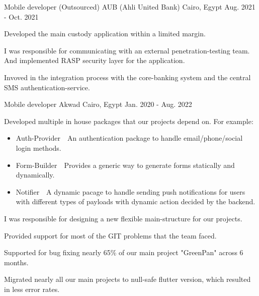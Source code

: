 \begin{cventries}
  \cventry
    {Mobile developer (Outsourced)} %
    {AUB (Ahli United Bank)} %
    {Cairo, Egypt} %
    {Aug. 2021 - Oct. 2021} %
    {
      \begin{cvitems} %
        \item {Developed the main custody application within a limited margin.}
        \item {I was responsible for communicating with an external penetration-testing team. And implemented RASP security layer for the application.}
        \item {Invoved in the integration process with the core-banking system and the central SMS authentication-service.}
      \end{cvitems}
    }

  \cventry
    {Mobile developer} %
    {Akwad} %
    {Cairo, Egypt} %
    {Jan. 2020 - Aug. 2022} %
    {
      \begin{cvitems} %
        \item {Developed multiple in house packages that our projects depend on. For example:}
        \begin{itemize}
          \item {Auth-Provider~\rightarrow~An authentication package to handle email/phone/social login methods.}
          \item {Form-Builder~\rightarrow~Provides a generic way to generate forms statically and dynamically.}
          \item {Notifier~\rightarrow~A dynamic pacage to handle sending push notifications for users with different types of payloads with dynamic action decided by the backend.}
        \end{itemize}
        \item {I was responsible for designing a new flexible main-structure for our projects.}
        \item {Provided support for most of the GIT problems that the team faced.}
        \item {Supported for bug fixing nearly 65\% of our main project "GreenPan" across 6 months.}
        \item {Migrated nearly all our main projects to null-safe flutter version, which resulted in less error rates.}
      \end{cvitems}
    }


\end{cventries}
